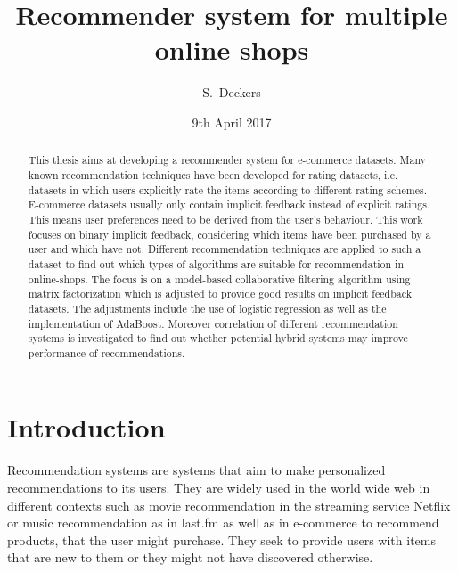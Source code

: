 \documentclass[10pt]{reportMaster}
\title{Recommender system for multiple online shops}
\author{S.\ Deckers}
\date{9th April 2017}
\begin{document}
\maketitle

\begin{abstract}
	This thesis aims at developing a recommender system for e-commerce datasets.
	Many known recommendation techniques have been developed for rating datasets, i.e. datasets in which users explicitly rate the items according to different rating schemes.
	E-commerce datasets usually only contain implicit feedback instead of explicit ratings.
	This means user preferences need to be derived from the user's behaviour.
	This work focuses on binary implicit feedback, considering which items have been purchased by a user and which have not.
	Different recommendation techniques are applied to such a dataset to find out which types of algorithms are suitable for recommendation in online-shops.
	The focus is on a model-based collaborative filtering algorithm using matrix factorization which is adjusted to provide good results on implicit feedback datasets.
	The adjustments include the use of logistic regression as well as the implementation of AdaBoost.
	Moreover correlation of different recommendation systems is investigated to find out whether potential hybrid systems may improve performance of recommendations.
\end{abstract}

\tableofcontents

\listoffigures
\listoftables
\listofalgorithms

\chapter{Introduction}
Recommendation systems are systems that aim to make personalized recommendations to its users.
They are widely used in the world wide web in different contexts such as movie recommendation in the streaming service Netflix or music recommendation as in last.fm as well as in e-commerce to recommend products, that the user might purchase.
They seek to provide users with items that are new to them or they might not have discovered otherwise.
\end{document}
